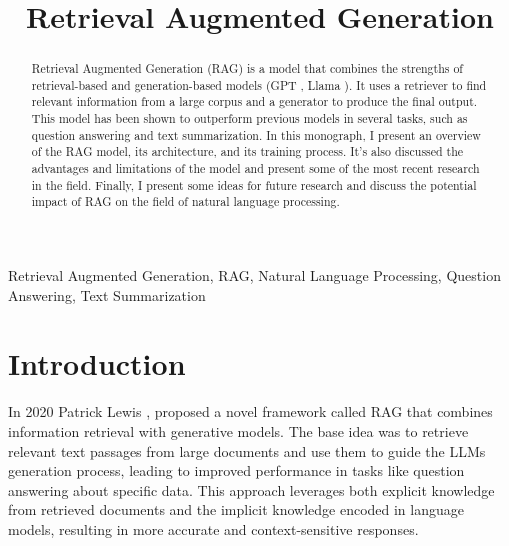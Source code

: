 \documentclass[conference]{IEEEtran}
\begin{document}
\title{Retrieval Augmented Generation}

\author{
    }

\maketitle

\begin{abstract}
    Retrieval Augmented Generation (RAG) is a model that combines the strengths of retrieval-based and generation-based models (GPT \cite{noauthor_chatgpt_nodate}, Llama \cite{noauthor_llama_nodate}).
    It uses a retriever to find relevant information from a large corpus and a generator to produce the final output.
    This model has been shown to outperform previous models in several tasks, such as question answering and text summarization.
    In this monograph, I present an overview of the RAG model, its architecture, and its training process.
    It's also discussed the advantages and limitations of the model and present some of the most recent research in the field.
    Finally, I present some ideas for future research and discuss the potential impact of RAG on the field of natural language processing.
\end{abstract}

\begin{IEEEkeywords}
    Retrieval Augmented Generation, RAG, Natural Language Processing, Question Answering, Text Summarization
\end{IEEEkeywords}

\section{Introduction}
In 2020 Patrick Lewis \cite{lewis_retrieval-augmented_2021}, proposed a novel framework called RAG
that combines information retrieval with generative models. The base idea was to retrieve relevant text passages
from large documents and use them to guide the LLMs generation process, leading to improved performance
in tasks like question answering about specific data. This approach leverages both explicit knowledge from retrieved
documents and the implicit knowledge encoded in language models, resulting in more accurate and
context-sensitive responses.
\end{document}
